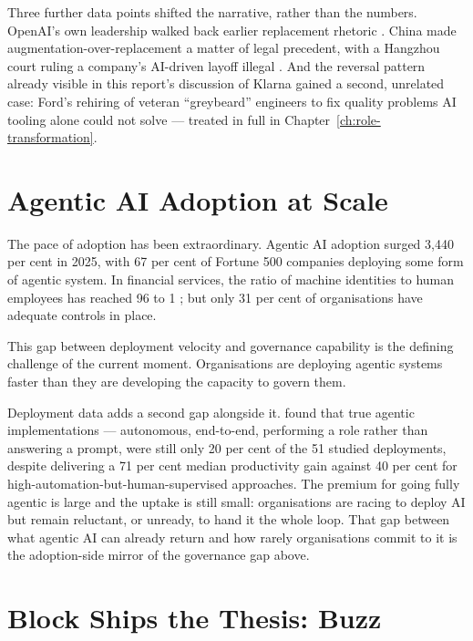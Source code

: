 Three further data points shifted the narrative, rather than the numbers. OpenAI's own leadership walked back earlier replacement rhetoric \parencite{Chatterji2026, AltmanReversal2026}. China made augmentation-over-replacement a matter of legal precedent, with a Hangzhou court ruling a company's AI-driven layoff illegal \parencite{NYTChina2026}. And the reversal pattern already visible in this report's discussion of Klarna gained a second, unrelated case: Ford's rehiring of veteran ``greybeard'' engineers to fix quality problems AI tooling alone could not solve \parencite{Bloomberg2026Ford} --- treated in full in Chapter~\ref{ch:role-transformation}.

\section{Agentic AI Adoption at Scale}

The pace of adoption has been extraordinary. Agentic AI adoption surged 3,440 per cent in 2025, with 67 per cent of Fortune 500 companies deploying some form of agentic system. In financial services, the ratio of machine identities to human employees has reached 96 to 1 \parencite{CyberArk2025}; but only 31 per cent of organisations have adequate controls in place.

This gap between deployment velocity and governance capability is the defining challenge of the current moment. Organisations are deploying agentic systems faster than they are developing the capacity to govern them.

Deployment data adds a second gap alongside it. \textcite{Pereira2026Playbook} found that true agentic implementations --- autonomous, end-to-end, performing a role rather than answering a prompt, were still only 20 per cent of the 51 studied deployments, despite delivering a 71 per cent median productivity gain against 40 per cent for high-automation-but-human-supervised approaches. The premium for going fully agentic is large and the uptake is still small: organisations are racing to deploy AI but remain reluctant, or unready, to hand it the whole loop. That gap between what agentic AI can already return and how rarely organisations commit to it is the adoption-side mirror of the governance gap above.

\section{Block Ships the Thesis: Buzz}

